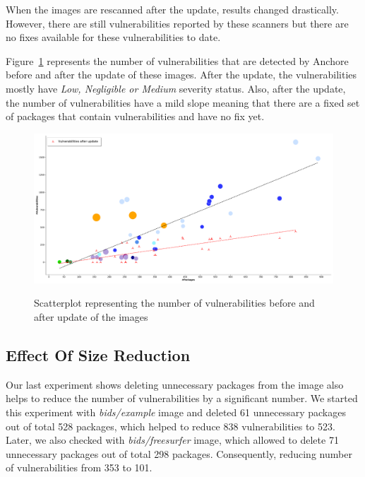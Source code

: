 \documentclass[a4paper,num-refs]{oup-contemporary}
\begin{document}
When the images are rescanned after the update, results changed drastically. However, there are still
vulnerabilities reported by these scanners but there are no fixes available for these vulnerabilities
to date.

Figure~\ref{fig:graph2} represents the number of vulnerabilities that are detected by Anchore before and after 
the update of these images.
After the update, the vulnerabilities mostly have \textit{Low, Negligible or Medium} severity status.
Also, after the update, the number of vulnerabilities have a mild slope meaning that there
are a fixed set of packages that contain vulnerabilities and have no fix yet.
\begin{figure}
        {\includegraphics[width=\textwidth]
        {Figures/vulnwithupdate.pdf}}
        \caption{\label{fig:graph2} Scatterplot representing the number of vulnerabilities before and 
	after update of the images}
      \end{figure}
\subsection{Effect Of Size Reduction}

Our last experiment shows deleting unnecessary packages from the image also helps to reduce
the number of vulnerabilities by a significant number. We started this experiment with
\textit{bids/example} image and deleted 61 unnecessary packages out of total 528 packages, which helped
to reduce 838 vulnerabilities to 523. Later, we also checked with \textit{bids/freesurfer} image, which allowed
to delete 71 unnecessary packages out of total 298 packages. Consequently, reducing number of vulnerabilities
from 353 to 101.
\end{document}
